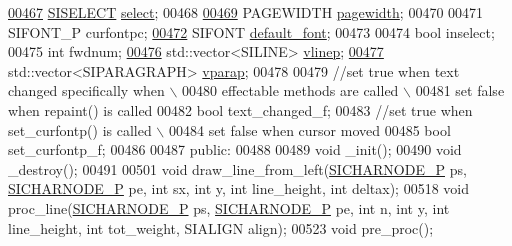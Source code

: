 \begin{DoxyCode}
\hyperlink{class_s_i_t_e_x_t_a536f8decde35b0149619ca1719c887b0}{00467}     \hyperlink{struct_s_i_r_a_n_g_e}{SISELECT} \hyperlink{class_s_i_t_e_x_t_a536f8decde35b0149619ca1719c887b0}{select};  
00468 
\hyperlink{class_s_i_t_e_x_t_afcb828b5d1da58d0f60088097e8c107b}{00469}     PAGEWIDTH \hyperlink{class_s_i_t_e_x_t_afcb828b5d1da58d0f60088097e8c107b}{pagewidth};   
00470 
00471     SIFONT\_P curfontpc; 
\hyperlink{class_s_i_t_e_x_t_abdacda1b7e48087a0aa2905702cb1d68}{00472}     SIFONT \hyperlink{class_s_i_t_e_x_t_abdacda1b7e48087a0aa2905702cb1d68}{default\_font};    
00473 
00474     \textcolor{keywordtype}{bool} inselect;  
00475     \textcolor{keywordtype}{int} fwdnum;
\hyperlink{class_s_i_t_e_x_t_abdabb47ab701f95f73b806df2c440347}{00476}     std::vector<SILINE> \hyperlink{class_s_i_t_e_x_t_abdabb47ab701f95f73b806df2c440347}{vlinep};   
\hyperlink{class_s_i_t_e_x_t_aeeeed4da4b7633b913a7a98336a91d75}{00477}     std::vector<SIPARAGRAPH> \hyperlink{class_s_i_t_e_x_t_aeeeed4da4b7633b913a7a98336a91d75}{vparap};  
00478 
00479     \textcolor{comment}{//set true when text changed specifically when \(\backslash\)}
00480 \textcolor{comment}{                effectable methods are called       \(\backslash\)}
00481 \textcolor{comment}{      set false when repaint() is called}
00482     \textcolor{keywordtype}{bool} text\_changed\_f;    
00483     \textcolor{comment}{//set true when set\_curfontp() is called \(\backslash\)}
00484 \textcolor{comment}{              set false when cursor moved}
00485     \textcolor{keywordtype}{bool} set\_curfontp\_f;
00486 
00487 \textcolor{keyword}{public}:
00488 
00489     \textcolor{keywordtype}{void} \_init();   
00490     \textcolor{keywordtype}{void} \_destroy();    
00491 
00501     \textcolor{keywordtype}{void} draw\_line\_from\_left(\hyperlink{class_s_i_c_h_a_r_n_o_d_e}{SICHARNODE\_P} ps, \hyperlink{class_s_i_c_h_a_r_n_o_d_e}{SICHARNODE\_P} pe, \textcolor{keywordtype}{int} sx, \textcolor{keywordtype}{int} y, \textcolor{keywordtype}{int} 
      line\_height, \textcolor{keywordtype}{int} deltax);
00518     \textcolor{keywordtype}{void} proc\_line(\hyperlink{class_s_i_c_h_a_r_n_o_d_e}{SICHARNODE\_P} ps, \hyperlink{class_s_i_c_h_a_r_n_o_d_e}{SICHARNODE\_P} pe, \textcolor{keywordtype}{int} n, \textcolor{keywordtype}{int} y, \textcolor{keywordtype}{int} line\_height,
       \textcolor{keywordtype}{int} tot\_weight, SIALIGN align);
00523     \textcolor{keywordtype}{void} pre\_proc();

\end{DoxyCode}
